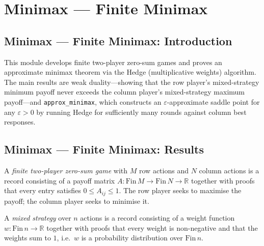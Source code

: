 \section{Minimax --- Finite Minimax}
\subsection*{Minimax --- Finite Minimax: Introduction}

This module develops finite two-player zero-sum games and proves an approximate
minimax theorem via the Hedge (multiplicative weights) algorithm.  The main
results are weak duality---showing that the row player's mixed-strategy minimum
payoff never exceeds the column player's mixed-strategy maximum payoff---and
\texttt{approx\_minimax}, which constructs an $\varepsilon$-approximate saddle
point for any $\varepsilon > 0$ by running Hedge for sufficiently many rounds
against column best responses.

\subsection*{Minimax --- Finite Minimax: Results}

\begin{definition}
\label{ZeroSumGame}
\leanok
A \emph{finite two-player zero-sum game} with $M$ row actions and $N$ column
actions is a record consisting of a payoff matrix $A : \mathrm{Fin}\,M \to
\mathrm{Fin}\,N \to \mathbb{R}$ together with proofs that every entry satisfies
$0 \le A_{ij} \le 1$.  The row player seeks to maximise the payoff; the column
player seeks to minimise it.
\end{definition}

\begin{definition}
\label{MixedStrategy}
\leanok
A \emph{mixed strategy} over $n$ actions is a record consisting of a weight
function $w : \mathrm{Fin}\,n \to \mathbb{R}$ together with proofs that every
weight is non-negative and that the weights sum to $1$, i.e.\ $w$ is a
probability distribution over $\mathrm{Fin}\,n$.
\end{definition}

